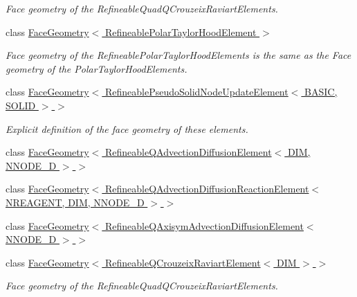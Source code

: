 \begin{DoxyCompactItemize}
\begin{DoxyCompactList}\small\item\em Face geometry of the Refineable\+Quad\+Q\+Crouzeix\+Raviart\+Elements. \end{DoxyCompactList}\item 
class \hyperlink{classoomph_1_1FaceGeometry_3_01RefineablePolarTaylorHoodElement_01_4}{Face\+Geometry$<$ Refineable\+Polar\+Taylor\+Hood\+Element $>$}
\begin{DoxyCompactList}\small\item\em Face geometry of the Refineable\+Polar\+Taylor\+Hood\+Elements is the same as the Face geometry of the Polar\+Taylor\+Hood\+Elements. \end{DoxyCompactList}\item 
class \hyperlink{classoomph_1_1FaceGeometry_3_01RefineablePseudoSolidNodeUpdateElement_3_01BASIC_00_01SOLID_01_4_01_4}{Face\+Geometry$<$ Refineable\+Pseudo\+Solid\+Node\+Update\+Element$<$ B\+A\+S\+I\+C, S\+O\+L\+I\+D $>$ $>$}
\begin{DoxyCompactList}\small\item\em Explicit definition of the face geometry of these elements. \end{DoxyCompactList}\item 
class \hyperlink{classoomph_1_1FaceGeometry_3_01RefineableQAdvectionDiffusionElement_3_01DIM_00_01NNODE__1D_01_4_01_4}{Face\+Geometry$<$ Refineable\+Q\+Advection\+Diffusion\+Element$<$ D\+I\+M, N\+N\+O\+D\+E\+\_\+D $>$ $>$}
\item 
class \hyperlink{classoomph_1_1FaceGeometry_3_01RefineableQAdvectionDiffusionReactionElement_3_01NREAGENT_00_01DIM_00_01NNODE__1D_01_4_01_4}{Face\+Geometry$<$ Refineable\+Q\+Advection\+Diffusion\+Reaction\+Element$<$ N\+R\+E\+A\+G\+E\+N\+T, D\+I\+M, N\+N\+O\+D\+E\+\_\+D $>$ $>$}
\item 
class \hyperlink{classoomph_1_1FaceGeometry_3_01RefineableQAxisymAdvectionDiffusionElement_3_01NNODE__1D_01_4_01_4}{Face\+Geometry$<$ Refineable\+Q\+Axisym\+Advection\+Diffusion\+Element$<$ N\+N\+O\+D\+E\+\_\+D $>$ $>$}
\item 
class \hyperlink{classoomph_1_1FaceGeometry_3_01RefineableQCrouzeixRaviartElement_3_01DIM_01_4_01_4}{Face\+Geometry$<$ Refineable\+Q\+Crouzeix\+Raviart\+Element$<$ D\+I\+M $>$ $>$}
\begin{DoxyCompactList}\small\item\em Face geometry of the Refineable\+Quad\+Q\+Crouzeix\+Raviart\+Elements. \end{DoxyCompactList}\item 

\end{DoxyCompactItemize}
